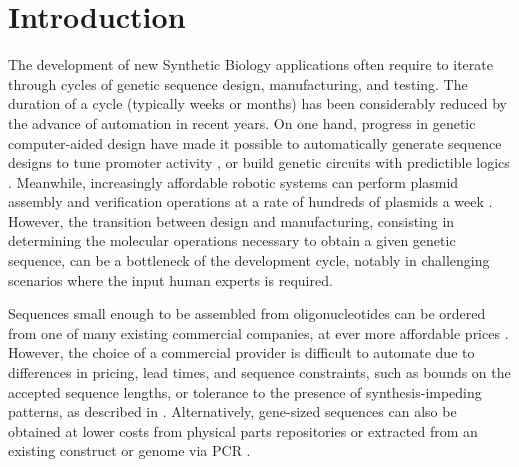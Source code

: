 \section{Introduction}
The development of new Synthetic Biology applications often require to iterate through cycles of genetic sequence design, manufacturing, and testing. The duration of a cycle (typically weeks or months) has been considerably reduced by the advance of automation in recent years. On one hand, progress in genetic computer-aided design have made it possible to automatically generate sequence designs to tune promoter activity \citep{Brown2017, Gilman2019}, or build genetic circuits with predictible logics \citep{Nielsen2016}. Meanwhile, increasingly affordable robotic systems can perform plasmid assembly and verification operations at a rate of hundreds of plasmids a week \citep{Storch2019, Shapland2015}. However, the transition between design and manufacturing, consisting in determining the molecular operations necessary to obtain a given genetic sequence, can be a bottleneck of the development cycle, notably in challenging scenarios where the input human experts is required.

Sequences small enough to be assembled from oligonucleotides can be ordered from one of many existing commercial companies, at ever more affordable prices \citep{Kosuri2014}. However, the choice of a commercial provider is difficult to automate due to differences in pricing, lead times, and sequence constraints, such as bounds on the accepted sequence lengths, or tolerance to the presence of synthesis-impeding patterns, as described in \citep{Oberortner2017}. Alternatively, gene-sized sequences can also be obtained at lower costs from physical parts repositories \citep{Vilanova2014, Guo2015} or extracted from an existing construct or genome via PCR \citep{Guo2015,Timmons2020}.

